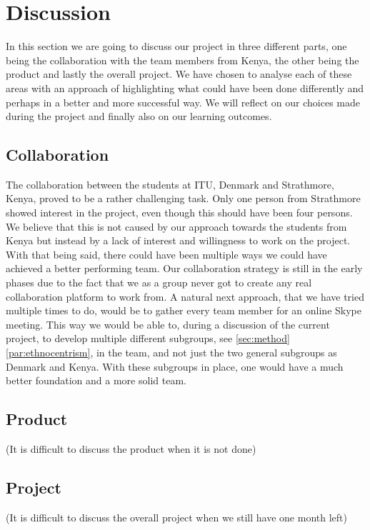 \section{Discussion}
In this section we are going to discuss our project in three different parts, one being the collaboration with the team members from Kenya, the other being the product and lastly the overall project. We have chosen to analyse each of these areas with an approach of highlighting what could have been done differently and perhaps in a better and more successful way. We will reflect on our choices made during the project and finally also on our learning outcomes.

\subsection{Collaboration}
The collaboration between the students at ITU, Denmark and Strathmore, Kenya, proved to be a rather challenging task. Only one person from Strathmore showed interest in the project, even though this should have been four persons. We believe that this is not caused by our approach towards the students from Kenya but instead by a lack of interest and willingness to work on the project.
With that being said, there could have been multiple ways we could have achieved a better performing team. Our collaboration strategy is still in the early phases due to the fact that we as a group never got to create any real collaboration platform to work from. 
A natural next approach, that we have tried multiple times to do, would be to gather every team member for an online Skype meeting. This way we would be able to, during a discussion of the current project, to develop multiple different subgroups, see \ref{sec:method} \ref{par:ethnocentrism}, in the team, and not just the two general subgroups as Denmark and Kenya. With these subgroups in place, one would have a much better foundation and a more solid team.

\subsection{Product}
(It is difficult to discuss the product when it is not done)

\subsection{Project}
(It is difficult to discuss the overall project when we still have one month left)

